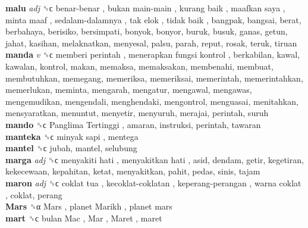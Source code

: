 \textbf{malu} \emph{adj}  ␝ϲ   benar-benar ,  bukan main-main ,  kurang baik ,  maafkan saya ,  minta maaf ,  sedalam-dalamnya ,  tak elok ,  tidak baik , bangpak, bangsai, berat, berbahaya, berisiko, bersimpati, bonyok, bonyor, buruk, busuk, ganas, getun, jahat, kasihan, melaknatkan, menyesal, palsu, parah, reput, rosak, teruk, tiruan  \\
\textbf{manda} \emph{v}  ␝ϲ   memberi perintah ,  menerapkan fungsi kontrol , berkabilan, kawal, kawalan, kontrol, makan, memaksa, memaksakan, membenahi, membuat, membutuhkan, memegang, memeriksa, memeriksai, memerintah, memerintahkan, memerlukan, meminta, mengarah, mengatur, mengawal, mengawas, mengemudikan, mengendali, menghendaki, mengontrol, menguasai, menitahkan, mensyaratkan, menuntut, menyetir, menyuruh, merajai, perintah, suruh  \\
\textbf{mando} ␝ϲ   Panglima Tertinggi , amaran, instruksi, perintah, tawaran  \\
\textbf{manteka} ␝ϲ   minyak sapi , mentega  \\
\textbf{mantel} ␝ϲ  jubah, mantel, selubung  \\
\textbf{marga} \emph{adj}  ␝ϲ   menyakiti hati ,  menyakitkan hati , asid, dendam, getir, kegetiran, kekecewaan, kepahitan, ketat, menyakitkan, pahit, pedas, sinis, tajam  \\
\textbf{maron} \emph{adj}  ␝ϲ   coklat tua ,  kecoklat-coklatan ,  keperang-perangan ,  warna coklat , coklat, perang  \\
\textbf{Mars} ␝α   Mars ,  planet Marikh ,  planet mars   \\
\textbf{mart} ␝ϲ   bulan Mac ,  Mar ,  Maret , maret  \\
